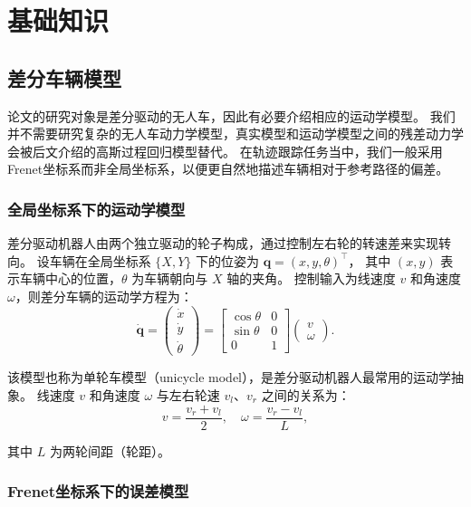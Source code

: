 \chapter{基础知识}

\section{差分车辆模型}

论文的研究对象是差分驱动的无人车，因此有必要介绍相应的运动学模型。
我们并不需要研究复杂的无人车动力学模型，真实模型和运动学模型之间的残差动力学会被后文介绍的高斯过程回归模型替代。
在轨迹跟踪任务当中，我们一般采用Frenet坐标系而非全局坐标系，以便更自然地描述车辆相对于参考路径的偏差。

\subsection{全局坐标系下的运动学模型}

差分驱动机器人由两个独立驱动的轮子构成，通过控制左右轮的转速差来实现转向。
设车辆在全局坐标系 $\{X, Y\}$ 下的位姿为 $\mathbf{q} = (x, y, \theta)^\top$，
其中 $(x, y)$ 表示车辆中心的位置，$\theta$ 为车辆朝向与 $X$ 轴的夹角。
控制输入为线速度 $v$ 和角速度 $\omega$，则差分车辆的运动学方程为：
\begin{equation}
    \dot{\mathbf{q}} =
    \begin{pmatrix} \dot{x} \\ \dot{y} \\ \dot{\theta} \end{pmatrix}
    =
    \begin{bmatrix} \cos\theta & 0 \\ \sin\theta & 0 \\ 0 & 1 \end{bmatrix}
    \begin{pmatrix} v \\ \omega \end{pmatrix}.
    \label{eq:unicycle}
\end{equation}

该模型也称为单轮车模型（unicycle model），是差分驱动机器人最常用的运动学抽象。
线速度 $v$ 和角速度 $\omega$ 与左右轮速 $v_l$、$v_r$ 之间的关系为：
\begin{equation}
    v = \frac{v_r + v_l}{2}, \quad \omega = \frac{v_r - v_l}{L},
\end{equation}

其中 $L$ 为两轮间距（轮距）。

\subsection{Frenet坐标系下的误差模型}

